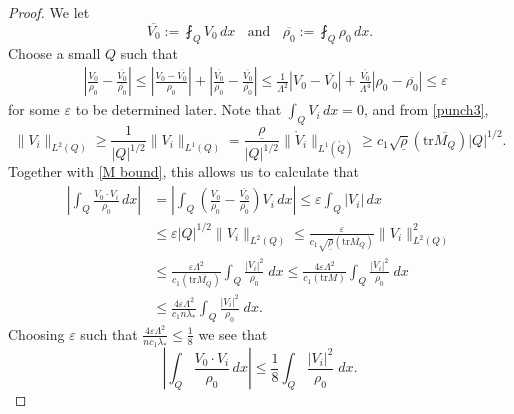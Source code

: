 \documentclass[12pt,reqno]{amsart}
\theoremstyle{definition}
\theoremstyle{remark}
\numberwithin{equation}{section}
\newcommand{\trace}{\mathrm{tr}}
\begin{document}
\begin{proof}
We let $$\overline{V_0}:= \fint_Q V_0\,dx\;\;\text{ and }\;\;\overline{\rho_0}:=\fint_Q \rho_0\,dx.$$
Choose  a small $Q$ such that 
\begin{equation*}
\begin{split}
&\left| \frac{V_0}{\rho_0}-\frac{\overline{V_0}}{\overline{\rho_0}} \right| \leq \left| \frac{V_0-\overline{V_0}}{\rho_0} \right| + \left| \frac{\overline{V_0}}{\rho_0}-\frac{\overline{V_0}}{\overline{\rho_0}} \right| \le \frac{1}{\Lambda^2} |V_0-\overline{V_0}| + \frac{\overline{V_0}}{\Lambda^4} |\rho_0-\overline{\rho_0}|
\leq \varepsilon 
\end{split}
\end{equation*}
for some $\varepsilon$ to be determined later. 
Note that $\int_{Q}V_i\,dx=0$, and from \eqref{punch3},
\[
\|V_i\|_{L^2(Q)} \ge \frac{1}{|Q|^{1/2}} \|V_i\|_{L^1(Q)} = \frac{{\underline{\rho}}}{|Q|^{1/2}} \|\mathring V_i\|_{L^1(\mathring Q)}\geq c_1 \sqrt{\underline{\rho}} (\trace   \overline{M_Q})|Q|^{1/2}.
\]
Together with \eqref{M bound}, this allows us to calculate that 
\begin{align*}
\left| \int_Q \frac{V_0 \cdot V_i}{\rho_0} \,dx \right|
&= \left| \int_Q \left( \frac{V_0}{\rho_0} - \frac{\overline{V_0}}{\overline{\rho_0}} \right) V_i\,dx \right| \leq \varepsilon \int_Q| V_i|\,dx \\
& \le \varepsilon |Q|^{1/2} \|V_i\|_{L^2(Q)} \le \frac{\varepsilon }{c_1 \sqrt{\underline{\rho}} (\trace   \overline{M_Q})} \|V_i\|^2_{L^2(Q)}  \\
& \le \frac{\varepsilon \Lambda^2 }{c_1 (\trace   \overline{M_Q})} \int_Q \frac{|V_i|^2}{\rho_0} \;dx \le \frac{4 \varepsilon \Lambda^2 }{c_1 (\trace M)} \int_Q \frac{|V_i|^2}{\rho_0} \;dx \\
& \le \frac{4 \varepsilon \Lambda^2 }{c_1 n \lambda_\ast} \int_Q \frac{|V_i|^2}{\rho_0} \;dx.
\end{align*}
Choosing $\varepsilon$ such that $\tfrac{4\varepsilon \Lambda^2}{n c_1 \lambda_\ast} \le \tfrac18$ we see that
\[
\left| \int_Q \frac{V_0 \cdot V_i}{\rho_0} \,dx \right| \le \frac18 \int_Q \frac{|V_i|^2}{\rho_0} \;dx.
\]


\end{proof}
\end{document}

